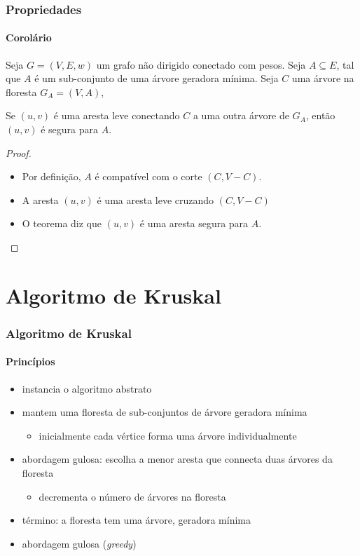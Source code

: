 \documentclass{beamer}
\begin{document}
\begin{frame}
\frametitle{Propriedades}
\framesubtitle{Corolário}

\begin{corollary}
Seja $G = (V, E, w)$ um grafo não dirigido conectado com pesos.  Seja
$A \subseteq E$, tal que $A$ é um sub-conjunto de uma árvore geradora
mínima. Seja $C$ uma árvore na floresta $G_A = (V, A)$,

Se $(u, v)$ é uma aresta leve conectando $C$ a uma outra árvore
de $G_A$, então $(u, v)$ é segura para $A$.
\end{corollary}

\begin{proof}
\begin{itemize}
\item Por definição, $A$ é compatível com o corte $(C, V-C)$. 
\item A aresta $(u, v)$ é uma aresta leve cruzando $(C, V-C)$
\item O teorema diz que $(u, v)$ é uma aresta segura para $A$.
\end{itemize}
\end{proof}
\end{frame}

\section{Algoritmo de Kruskal}

\begin{frame}
\frametitle{Algoritmo de Kruskal}
\framesubtitle{Princípios}

\begin{itemize}
\item instancia o algoritmo abstrato
\item mantem uma floresta de sub-conjuntos de árvore geradora mínima
\begin{itemize}
\item inicialmente cada vértice forma uma árvore individualmente
\end{itemize}
\item abordagem gulosa: escolha a menor aresta que connecta duas árvores
  da floresta
\begin{itemize}
\item decrementa o número de árvores na floresta
\end{itemize}
\item término: a floresta tem uma árvore, geradora mínima
\item \alert{abordagem gulosa} (\textit{greedy\/})
\end{itemize}

\end{frame}
\end{document}
